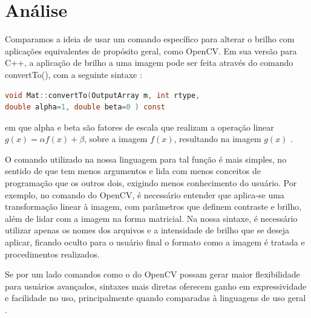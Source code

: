 \documentclass[a4paper, 10pt, conference]{ieeeconf}
\begin{document}
\section{Análise}


Comparamos a ideia de usar um comando específico para alterar o brilho com aplicações equivalentes de propósito geral, como OpenCV. Em sua versão para C++, a aplicação de brilho a uma imagem pode ser feita através do comando convertTo(), com a seguinte sintaxe \cite{opencv2}:
\begin{lstlisting}[language=C, basicstyle=\footnotesize]
void Mat::convertTo(OutputArray m, int rtype, 
double alpha=1, double beta=0 ) const
\end{lstlisting}
em que alpha e beta são fatores de escala que realizam a operação linear $g(x)=\alpha f(x) + \beta$, sobre a imagem $f(x)$, resultando na imagem $g(x)$ \cite{opencv}.

O comando utilizado na nossa linguagem para tal função é mais simples, no sentido de que tem menos argumentos e lida com menos conceitos de programação que os outros dois, exigindo menos conhecimento do usuário. Por exemplo, no comando do OpenCV, é necessário entender que aplica-se uma transformação linear à imagem, com parâmetros que definem contraste e brilho, além de lidar com a imagem na forma matricial. Na nossa sintaxe, é necessário utilizar apenas os nomes dos arquivos e a intensidade de brilho que se deseja aplicar, ficando oculto para o usuário final o formato como a imagem é tratada e procedimentos realizados.

Se por um lado comandos como o do OpenCV possam gerar maior flexibilidade para usuários avançados, sintaxes mais diretas oferecem ganho em expressividade e facilidade no uso, principalmente quando comparadas à linguagens de uso geral \cite{dsl}.
\end{document}
